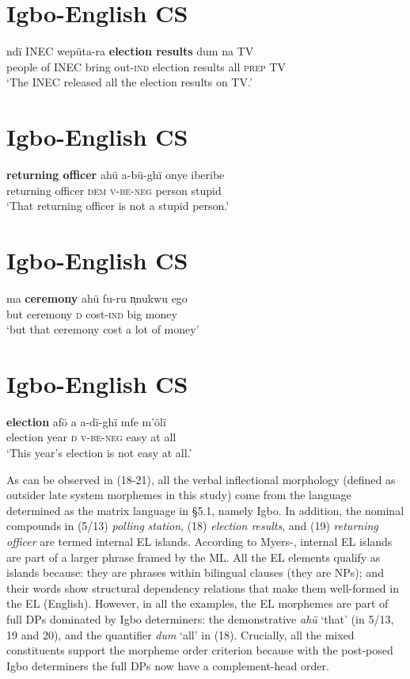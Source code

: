 \documentclass[output=paper]{langsci/langscibook}
\begin{document}
\chapter{Igbo-English CS}
\gll ndï    INEC  wepüta-ra  \textbf{election results}   dum  na  TV\\
     people of  INEC  bring out-\textsc{ind}   election results  all  \textsc{prep}  TV\\
\glt ‘The INEC released all the election results on TV.’    
\z

\chapter{Igbo-English CS}
\gll \textbf{returning officer  }ahü       a-bü-ghï        onye    iberibe\\
     returning officer     \textsc{dem}  \textsc{v-be-neg}  person  stupid\\
\glt ‘That returning officer is not a stupid person.’
\z

\chapter{Igbo-English CS}
\gll ma  \textbf{ceremony   }ahü  fu-ru      n̩nukwu   ego\\
     but ceremony  \textsc{d}  cost-\textsc{ind}  big    money\\
\glt ‘but that ceremony cost a lot of money’
\z

\chapter{Igbo-English CS}
\gll \textbf{election  }afö  a  a-dï-ghï  mfe  m’ölï\\
     election    year  \textsc{d}  \textsc{v-be-neg}  easy  at all\\
\glt ‘This year’s election is not easy at all.’
\z

As can be observed in (18-21), all the verbal inflectional morphology (defined as outsider late system morphemes in this study) come from the language determined as the matrix language in §5.1, namely Igbo. In addition, the nominal compounds in (5/13) \textit{polling}\textbf{\textit{ }}\textit{station}, (18) \textit{election results}, and (19) \textit{returning officer }are termed internal EL islands. According to Myers-\citet[265]{Scotton2006}, internal EL islands are part of a larger phrase framed by the ML. All the EL elements qualify as islands because: they are phrases within bilingual clauses (they are NPs); and their words show structural dependency relations that make them well-formed in the EL (English). However, in all the examples, the EL morphemes are part of full DPs dominated by Igbo determiners: the demonstrative \textit{ahü} ‘that’ (in 5/13, 19 and 20), and the quantifier \textit{dum }‘all’ in (18). Crucially, all the mixed constituents support the morpheme order criterion because with the post-posed Igbo determiners the full DPs now have a complement-head order. 
\end{document}
